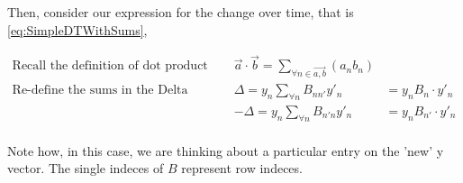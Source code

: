 \documentclass[border=1pt]{article}
\begin{document}
Then, consider our expression for the change over time, that is \autoref{eq:SimpleDTWithSums}, 

\begin{eqnarray}
	\text{Recall the definition of dot product}& \vec{a} \cdot \vec{b}=\sum_{\forall n \in \vec{a, b}}(a_n b_n)\\
	\text{Re-define the sums in the Delta Equations} & \Delta = y_n \sum_{\forall n} B_{nn'}y'_n & =y_n B_n \cdot y'_n\\
	&-\Delta = y_n \sum_{\forall n} B_{n'n} y'_n & =y_n B_{n'} \cdot y'_n\\
\end{eqnarray}

Note how, in this case, we are thinking about a particular entry on the 'new' y vector. The single indeces of $B$ represent row indeces. 

\begin{appendices}
\renewcommand{\rightmark}{Appendix \thesection}

	\begin{landscape}
	\end{landscape}

\end{appendices}
\printindex
\printbibliography
\end{document}
